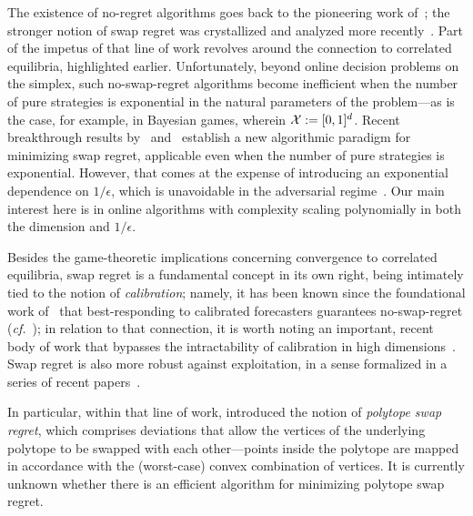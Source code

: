 The existence of no-regret algorithms goes back to the pioneering work of~\citet{Blackwell56:analog}; the stronger notion of swap regret was crystallized and analyzed more recently~\citep{Blum07:From,Stoltz05:Internal,Hart00:Simple}. Part of the impetus of that line of work revolves around the connection to correlated equilibria, highlighted earlier. Unfortunately, beyond online decision problems on the simplex, such no-swap-regret algorithms become inefficient when the number of pure strategies is exponential in the natural parameters of the problem---as is the case, for example, in Bayesian games, wherein ${\mathcal{X}} := [0, 1]^d$. Recent breakthrough results by~\citet{Dagan24:From} and~\citet{Peng24:Fast} establish a new algorithmic paradigm for minimizing swap regret, applicable even when the number of pure strategies is exponential. However, that comes at the expense of introducing an exponential dependence on $1/\epsilon$, which is unavoidable in the adversarial regime~\citep{Daskalakis24:Lower}. Our main interest here is in online algorithms with complexity scaling polynomially in both the dimension and $1/\epsilon$.

Besides the game-theoretic implications concerning convergence to correlated equilibria, swap regret is a fundamental concept in its own right, being intimately tied to the notion of \emph{calibration}; namely, it has been known since the foundational work of~\citet{Foster97:Calibrated} that best-responding to calibrated forecasters guarantees no-swap-regret (\emph{cf.}\  \citet{Foster18:Smooth}); in relation to that connection, it is worth noting an important, recent body of work that bypasses the intractability of calibration in high dimensions~\citep{Noarov23:High,Roth24:Forecasting,Hu24:Predict}. Swap regret is also more robust against exploitation, in a sense formalized in a series of recent papers~\citep{Assos24:Maximizing,Mansour22:Strategizing,Deng19:Strategizing,Guruganesh24:Contracting}. 

In particular, within that line of work, \citet{Mansour22:Strategizing} introduced the notion of \emph{polytope swap regret}, which comprises deviations that allow the vertices of the underlying polytope to be swapped with each other---points inside the polytope are mapped in accordance with the (worst-case) convex combination of vertices. It is currently unknown whether there is an efficient algorithm for minimizing polytope swap regret.

